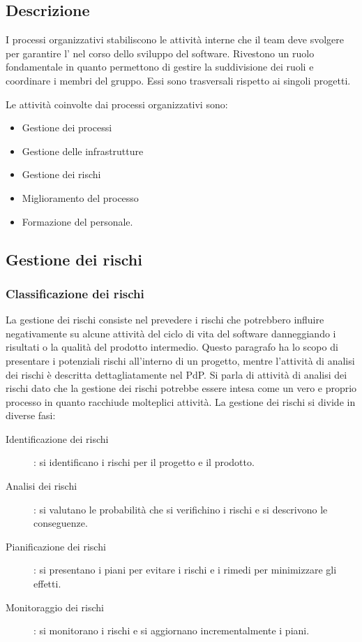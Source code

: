 \documentclass[../norme-di-progetto.tex]{subfiles}
\begin{document}
\subsection{Descrizione}%
\label{sub:processi_organizzativi/descrizione}

I processi organizzativi stabiliscono le attività interne che il team deve svolgere per garantire l' nel corso dello sviluppo del software.
Rivestono un ruolo fondamentale in quanto permettono di gestire la suddivisione dei ruoli e coordinare i membri del gruppo.
Essi sono trasversali rispetto ai singoli progetti.

Le attività coinvolte dai processi organizzativi sono:

\begin{itemize}
  \item Gestione dei processi
  \item Gestione delle infrastrutture
  \item Gestione dei rischi
  \item Miglioramento del processo
  \item Formazione del personale.
\end{itemize}

\subsection{Gestione dei rischi}%
\label{sub:gestione_dei_rischi}

\subsubsection{Classificazione dei rischi}%
\label{subs:classificazione_dei_rischi}
La gestione dei rischi consiste nel prevedere i rischi che potrebbero influire negativamente su alcune attività del ciclo di vita del software danneggiando i risultati o la qualità del prodotto intermedio.
Questo paragrafo ha lo scopo di presentare i potenziali rischi all'interno di un progetto, mentre l'attività di analisi dei rischi è descritta dettagliatamente nel PdP.
Si parla di attività di analisi dei rischi dato che la gestione dei rischi potrebbe essere intesa come un vero e proprio processo in quanto racchiude molteplici attività. La gestione dei rischi si divide in diverse fasi:

\begin{description}
  \item [Identificazione dei rischi]: si identificano i rischi per il progetto e il prodotto.
  \item [Analisi dei rischi]: si valutano le probabilità che si verifichino i rischi e si descrivono le conseguenze.
  \item [Pianificazione dei rischi]: si presentano i piani per evitare i rischi e i rimedi per minimizzare gli effetti.
  \item [Monitoraggio dei rischi]: si monitorano i rischi e si aggiornano incrementalmente i piani.
\end{description}
\end{document}
